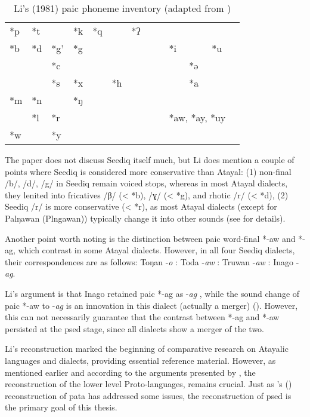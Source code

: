 \begingroup
{}
\renewcommand\arraystretch{1.5}
\begin{table}[H]
\centering
\caption{Li's (1981) \acl{paic} phoneme inventory (adapted from \cite[272]{li1981paic})}
\label{tab:lipaic}
\begin{tabular}{lllllllllllll}
\hline
*p & *t &    & *k & *q &   & *ʔ &  &  &          &          &          &  \\
*b & *d & *g' & *g &   &   &   &  &  & *i        &          & *u        &  \\
  &   & *c  &   &   &   &   &  &  &          & *ə        &          &  \\
  &   & *s  & *x &   & *h &   &  &  &          & *a        &          &  \\
*m & *n &    & *ŋ &   &   &   &  &  &          &          &          &  \\
  & *l & *r  &   &   &   &   &  &  & \multicolumn{3}{l}{*aw, *ay, *uy} &  \\
*w &   & *y  &   &   &   &   &  &  &          &          &          &  \\ \hline
\end{tabular}
\end{table}
\endgroup

The paper does not discuss Seediq itself much, but Li does mention a couple of points where Seediq is considered more conservative than Atayal: (1) non-final /b/, /d/, /g/ in Seediq remain voiced stops, whereas in most Atayal dialects, they lenited into fricatives /β/ (< *b), /ɣ/ (< *g), and rhotic /r/ (< *d), (2) Seediq /r/ is more conservative (< *r), as most Atayal dialects (except for Palŋawan (Plngawan)) typically change it into other sounds (see \cite[264--265]{li1981paic} for details).

Another point worth noting is the distinction between \acl{paic} word-final *-aw and *-ag, which contrast in some Atayal dialects. However, in all four Seediq dialects, their correspondences are as follows: Toŋan -\textit{o} : Toda -\textit{aw} : Truwan -\textit{aw} : Inago -\textit{ag}.

Li's argument is that Inago retained \ac{paic} *-ag as -\textit{ag} , while the sound change of \ac{paic} *-aw to -\textit{ag} is an innovation in this dialect (actually a merger) (\cite[257--258,271]{li1981paic}). However, this can not necessarily guarantee that the contrast between *-ag and *-aw persisted at the \acl{psed} stage, since all dialects show a merger of the two.

Li's reconstruction marked the beginning of comparative research on Atayalic languages and dialects, providing essential reference material. However, as mentioned earlier and according to the arguments presented by \textcite{song2022Aicd,song2023Aicgprime}, the reconstruction of the lower level Proto-languages, remains crucial. Just as \citeauthor{goderich2020phd}'s (\citeyear{goderich2020phd}) reconstruction of \acl{pata} has addressed some issues, the reconstruction of \acl{psed} is the primary goal of this thesis.

